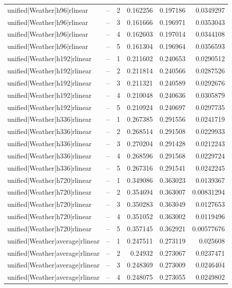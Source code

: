 \begin{longtable}{llrrrr}
unified|Weather|h96|rlinear & -- & 2 & 0.162256 & 0.197186 & 0.0349297 \\
unified|Weather|h96|rlinear & -- & 3 & 0.161666 & 0.196971 & 0.0353043 \\
unified|Weather|h96|rlinear & -- & 4 & 0.162603 & 0.197014 & 0.0344108 \\
unified|Weather|h96|rlinear & -- & 5 & 0.161304 & 0.196964 & 0.0356593 \\
unified|Weather|h192|rlinear & -- & 1 & 0.211602 & 0.240653 & 0.0290512 \\
unified|Weather|h192|rlinear & -- & 2 & 0.211814 & 0.240566 & 0.0287526 \\
unified|Weather|h192|rlinear & -- & 3 & 0.211321 & 0.240589 & 0.0292676 \\
unified|Weather|h192|rlinear & -- & 4 & 0.210048 & 0.240636 & 0.0305879 \\
unified|Weather|h192|rlinear & -- & 5 & 0.210924 & 0.240697 & 0.0297735 \\
unified|Weather|h336|rlinear & -- & 1 & 0.267385 & 0.291556 & 0.0241719 \\
unified|Weather|h336|rlinear & -- & 2 & 0.268514 & 0.291508 & 0.0229933 \\
unified|Weather|h336|rlinear & -- & 3 & 0.270204 & 0.291428 & 0.0212243 \\
unified|Weather|h336|rlinear & -- & 4 & 0.268596 & 0.291568 & 0.0229724 \\
unified|Weather|h336|rlinear & -- & 5 & 0.267316 & 0.291541 & 0.0242245 \\
unified|Weather|h720|rlinear & -- & 1 & 0.349086 & 0.363023 & 0.0139367 \\
unified|Weather|h720|rlinear & -- & 2 & 0.354694 & 0.363007 & 0.00831294 \\
unified|Weather|h720|rlinear & -- & 3 & 0.350283 & 0.363049 & 0.0127653 \\
unified|Weather|h720|rlinear & -- & 4 & 0.351052 & 0.363002 & 0.0119496 \\
unified|Weather|h720|rlinear & -- & 5 & 0.357145 & 0.362921 & 0.00577676 \\
unified|Weather|average|rlinear & -- & 1 & 0.247511 & 0.273119 & 0.025608 \\
unified|Weather|average|rlinear & -- & 2 & 0.24932 & 0.273067 & 0.0237471 \\
unified|Weather|average|rlinear & -- & 3 & 0.248369 & 0.273009 & 0.0246404 \\
unified|Weather|average|rlinear & -- & 4 & 0.248075 & 0.273055 & 0.0249802 \\

\end{longtable}
